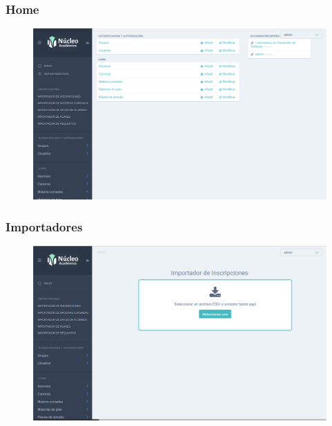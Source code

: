 \subsubsection{Home}
\begin{figure}[h!]
  \centering
    \includegraphics[scale=0.3]{images/nucleo/nucleo-home.png}
  \label{fig:django}
\end{figure}

\subsubsection{Importadores}
\begin{figure}[h!]
  \centering
    \includegraphics[scale=0.3]{images/nucleo/nucleo-importador.png}
  \label{fig:django}
\end{figure}

